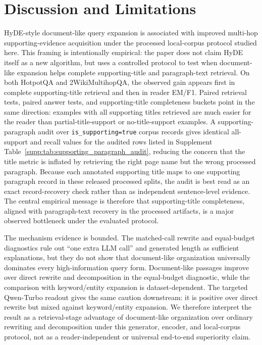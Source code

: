 \section{Discussion and Limitations}
\label{sec:discussion_limitations}

HyDE-style document-like query expansion is associated with improved multi-hop supporting-evidence acquisition under the processed local-corpus protocol studied here. This framing is intentionally empirical: the paper does not claim HyDE itself as a new algorithm, but uses a controlled protocol to test when document-like expansion helps complete supporting-title and paragraph-text retrieval. On both HotpotQA and 2WikiMultihopQA, the observed gain appears first in complete supporting-title retrieval and then in reader EM/F1. Paired retrieval tests, paired answer tests, and supporting-title completeness buckets point in the same direction: examples with all supporting titles retrieved are much easier for the reader than partial-title-support or no-title-support examples. A supporting-paragraph audit over \texttt{is\_supporting=true} corpus records gives identical all-support and recall values for the audited rows listed in Supplement Table~\ref{supp:tab:supporting_paragraph_audit}, reducing the concern that the title metric is inflated by retrieving the right page name but the wrong processed paragraph. Because each annotated supporting title maps to one supporting paragraph record in these released processed splits, the audit is best read as an exact record-recovery check rather than as independent sentence-level evidence. The central empirical message is therefore that supporting-title completeness, aligned with paragraph-text recovery in the processed artifacts, is a major observed bottleneck under the evaluated protocol.

The mechanism evidence is bounded. The matched-call rewrite and equal-budget diagnostics rule out ``one extra LLM call'' and generated length as sufficient explanations, but they do not show that document-like organization universally dominates every high-information query form. Document-like passages improve over direct rewrite and decomposition in the equal-budget diagnostic, while the comparison with keyword/entity expansion is dataset-dependent. The targeted Qwen-Turbo readout gives the same caution downstream: it is positive over direct rewrite but mixed against keyword/entity expansion. We therefore interpret the result as a retrieval-stage advantage of document-like organization over ordinary rewriting and decomposition under this generator, encoder, and local-corpus protocol, not as a reader-independent or universal end-to-end superiority claim.

